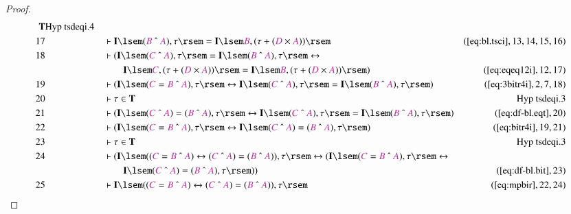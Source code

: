 \begin{proof}
\begin{align}
      \mathbf{T}&\text{Hyp~tsdeqi.4}\notag%
  \\ 17 &&  & \vdash \mathbf{I} \lsem ( \mc{B} ~\string^~ \mc{A} ) , \tau \rsem
      = \mathbf{I} \lsem \mc{B} , ( \tau + ( \mc{D} \times
      \mc{A} ) )
      \rsem&(\mbox{\ref{eq:bl.tsci}},13,14,15,16)\notag
  \\ 18 &&  & \vdash ( \mathbf{I} \lsem ( \mc{C} ~\string^~ \mc{A} ) , \tau
      \rsem = \mathbf{I} \lsem ( \mc{B} ~\string^~ \mc{A} )
      , \tau \rsem \leftrightarrow  \notag \\ & & & \qquad
     \mathbf{I} \lsem \mc{C}
      , ( \tau + ( \mc{D} \times \mc{A} ) ) \rsem =
      \mathbf{I} \lsem \mc{B} , ( \tau + ( \mc{D} \times
      \mc{A} ) ) \rsem
      )&(\mbox{\ref{eq:eqeq12i}},12,17)\notag
  \\ 19 &&  & \vdash ( \mathbf{I} \lsem ( \mc{C} = \mc{B} ~\string^~ \mc{A} ) ,
      \tau \rsem \leftrightarrow \mathbf{I} \lsem ( \mc{C}
      ~\string^~ \mc{A} ) , \tau \rsem = \mathbf{I} \lsem (
      \mc{B} ~\string^~ \mc{A} ) , \tau \rsem
      )&(\mbox{\ref{eq:3bitr4i}},2,7,18)\notag
  \\ 20 &&  & \vdash \tau \in \mathbf{T}&\text{Hyp~tsdeqi.3}\notag%
  \\ 21 &&  & \vdash ( \mathbf{I} \lsem ( \mc{C} ~\string^~ \mc{A} ) = ( \mc{B}
      ~\string^~ \mc{A} ) , \tau \rsem \leftrightarrow
      \mathbf{I} \lsem ( \mc{C} ~\string^~ \mc{A} ) , \tau
      \rsem = \mathbf{I} \lsem ( \mc{B} ~\string^~ \mc{A} )
      , \tau \rsem )&(\mbox{\ref{eq:df-bl.eqt}},20)\notag
  \\ 22 &&  & \vdash ( \mathbf{I} \lsem ( \mc{C} = \mc{B} ~\string^~ \mc{A} ) ,
      \tau \rsem \leftrightarrow \mathbf{I} \lsem ( \mc{C}
      ~\string^~ \mc{A} ) = ( \mc{B} ~\string^~ \mc{A} ) ,
      \tau \rsem )&(\mbox{\ref{eq:bitr4i}},19,21)\notag
  \\ 23 &&  & \vdash \tau \in \mathbf{T}&\text{Hyp~tsdeqi.3}\notag%
  \\ 24 &&  & \vdash ( \mathbf{I} \lsem ( ( \mc{C} = \mc{B} ~\string^~ \mc{A} )
      \leftrightarrow ( \mc{C} ~\string^~ \mc{A} ) = (
      \mc{B} ~\string^~ \mc{A} ) ) , \tau \rsem
      \leftrightarrow ( \mathbf{I} \lsem ( \mc{C} = \mc{B}
      ~\string^~ \mc{A} ) , \tau \rsem \leftrightarrow  \notag \\ & & & \qquad
      \mathbf{I} \lsem ( \mc{C} ~\string^~ \mc{A} ) = (
      \mc{B} ~\string^~ \mc{A} ) , \tau \rsem )
      )&(\mbox{\ref{eq:df-bl.bit}},23)\notag
  \\ 25 &&  & \vdash \mathbf{I} \lsem ( ( \mc{C} = \mc{B} ~\string^~ \mc{A} )
      \leftrightarrow ( \mc{C} ~\string^~ \mc{A} ) = (
      \mc{B} ~\string^~ \mc{A} ) ) , \tau
      \rsem&(\mbox{\ref{eq:mpbir}},22,24)\notag
\end{align}
\end{proof}

